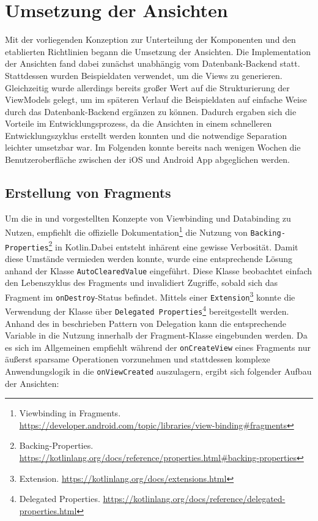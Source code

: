\newpage

\section{Umsetzung der Ansichten}

Mit der vorliegenden Konzeption zur Unterteilung der Komponenten und den etablierten Richtlinien begann die Umsetzung der Ansichten. Die Implementation der Ansichten fand dabei zunächst unabhängig vom Datenbank-Backend statt. Stattdessen wurden Beispieldaten verwendet, um die Views zu generieren. Gleichzeitig wurde allerdings bereits großer Wert auf die Strukturierung der ViewModels gelegt, um im späteren Verlauf die Beispieldaten auf einfache Weise durch das Datenbank-Backend ergänzen zu können. Dadurch ergaben sich die Vorteile im Entwicklungsprozess, da die Ansichten in einem schnelleren Entwicklungszyklus erstellt werden konnten und die notwendige Separation leichter umsetzbar war. Im Folgenden konnte bereits nach wenigen Wochen die Benutzeroberfläche zwischen der iOS und Android App abgeglichen werden.

\subsection{Erstellung von Fragments}\label{sub:fragments}

Um die in  und  vorgestellten Konzepte von Viewbinding und Databinding zu Nutzen, empfiehlt die offizielle Dokumentation\footnote{Viewbinding in Fragments. \url{https://developer.android.com/topic/libraries/view-binding\#fragments}} die Nutzung von \texttt{Backing-Properties}\footnote{Backing-Properties. \url{https://kotlinlang.org/docs/reference/properties.html\#backing-properties}} in Kotlin.Dabei entsteht inhärent eine gewisse Verbosität. Damit diese Umstände vermieden werden konnte, wurde eine entsprechende Lösung anhand der Klasse \texttt{AutoClearedValue} eingeführt. Diese Klasse beobachtet einfach den Lebenszyklus des Fragments und invalidiert Zugriffe, sobald sich das Fragment im \texttt{onDestroy}-Status befindet. Mittels einer \texttt{Extension}\footnote{Extension. \url{https://kotlinlang.org/docs/extensions.html}} konnte die Verwendung der Klasse über \texttt{Delegated Properties}\footnote{Delegated Properties. \url{https://kotlinlang.org/docs/reference/delegated-properties.html}} bereitgestellt werden. Anhand des in  beschrieben Pattern von Delegation kann die entsprechende Variable in die Nutzung innerhalb der Fragment-Klasse eingebunden werden. Da es sich im Allgemeinen empfiehlt während der \texttt{onCreateView} eines Fragments nur äußerst sparsame Operationen vorzunehmen und stattdessen komplexe Anwendungslogik in die \texttt{onViewCreated} auszulagern, ergibt sich folgender Aufbau der Ansichten:

